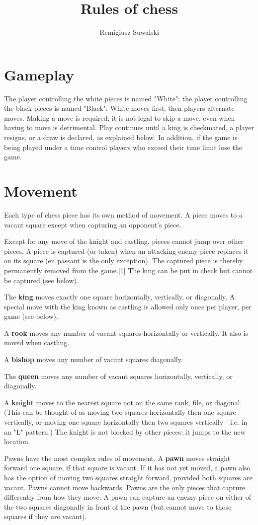\documentclass[a4paper,8pt]{extarticle}
\begin{document}
\author{Remigiusz Suwalski}
\title{Rules of chess}

\section{Gameplay}
The player controlling the white pieces is named "White"; the player controlling the black pieces is named "Black". White moves first, then players alternate moves. Making a move is required; it is not legal to skip a move, even when having to move is detrimental. Play continues until a king is checkmated, a player resigns, or a draw is declared, as explained below. In addition, if the game is being played under a time control players who exceed their time limit lose the game. 

\section{Movement}
Each type of chess piece has its own method of movement. A piece moves to a vacant square except when capturing an opponent's piece. 

Except for any move of the knight and castling, pieces cannot jump over other pieces. A piece is captured (or taken) when an attacking enemy piece replaces it on its square (en passant is the only exception). The captured piece is thereby permanently removed from the game.[1] The king can be put in check but cannot be captured (see below).

The \textbf{king} moves exactly one square horizontally, vertically, or diagonally. A special move with the king known as castling is allowed only once per player, per game (see below).

A \textbf{rook} moves any number of vacant squares horizontally or vertically. It also is moved when castling.

A \textbf{bishop} moves any number of vacant squares diagonally.

The \textbf{queen} moves any number of vacant squares horizontally, vertically, or diagonally.

A \textbf{knight} moves to the nearest square not on the same rank, file, or diagonal. (This can be thought of as moving two squares horizontally then one square vertically, or moving one square horizontally then two squares vertically—i.e. in an "L" pattern.) The knight is not blocked by other pieces: it jumps to the new location.

Pawns have the most complex rules of movement.
A \textbf{pawn} moves straight forward one square, if that square is vacant. If it has not yet moved, a pawn also has the option of moving two squares straight forward, provided both squares are vacant. Pawns cannot move backwards.
Pawns are the only pieces that capture differently from how they move. A pawn can capture an enemy piece on either of the two squares diagonally in front of the pawn (but cannot move to those squares if they are vacant).
\end{document}
